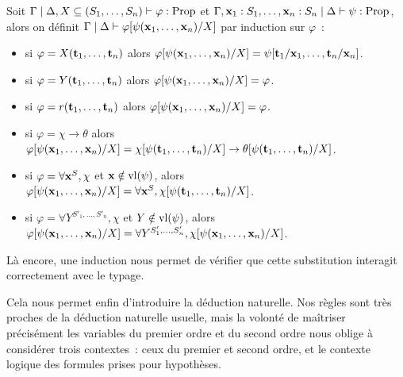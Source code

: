 \documentclass{article}
\begin{document}
\begin{defi}
    Soit $\Gamma\mid \Delta, X \subseteq (S_1,\ldots,S_n)\vdash \varphi : \mathrm{Prop}$ et $\Gamma, \mathbf{x}_1 : S_1,\ldots, \mathbf{x}_n : S_n\mid\Delta\vdash \psi : \mathrm{Prop}$, alors on définit $\Gamma\mid\Delta\vdash\varphi[\psi(\mathbf{x}_1,\ldots,\mathbf{x}_n)/X]$ par induction sur $\varphi$~:
    \begin{itemize}
        \item si $\varphi = X(\mathbf{t}_1,\ldots,\mathbf{t}_n)$ alors $\varphi[\psi(\mathbf{x}_1,\ldots,\mathbf{x}_n)/X] = \psi[\mathbf{t}_1/\mathbf{x}_1,\ldots,\mathbf{t}_n/\mathbf{x}_n]$.
        \item si $\varphi = Y(\mathbf{t}_1,\ldots,\mathbf{t}_n)$ alors $\varphi[\psi(\mathbf{x}_1,\ldots,\mathbf{x}_n)/X] = \varphi$.
        \item si $\varphi = r(\mathbf{t}_1,\ldots,\mathbf{t}_n)$ alors $\varphi[\psi(\mathbf{x}_1,\ldots,\mathbf{x}_n)/X] = \varphi$.
        \item si $\varphi = \chi \to \theta$ alors $\varphi[\psi(\mathbf{x}_1,\ldots,\mathbf{x}_n)/X] = \chi[\psi(\mathbf{t}_1,\ldots,\mathbf{t}_n)/X] \to \theta[\psi(\mathbf{t}_1,\ldots,\mathbf{t}_n)/X]$.
        \item si $\varphi = \forall \mathbf{x}^S, \chi$ et $\mathbf{x} \notin \mathrm{vl}(\psi)$, alors $\varphi[\psi(\mathbf{x}_1,\ldots,\mathbf{x}_n)/X] = \forall \mathbf{x}^S, \chi[\psi(\mathbf{t}_1,\ldots,\mathbf{t}_n)/X]$.
        \item si $\varphi = \forall Y^{S'_1,\ldots,S'_n}, \chi$ et $Y\notin\mathrm{vl}(\psi)$, alors $\varphi[\psi(\mathbf{x}_1,\ldots,\mathbf{x}_n)/X] = \forall Y^{S'_1,\ldots,S'_n}, \chi[\psi(\mathbf{x}_1,\ldots,\mathbf{x}_n)/X]$.
    \end{itemize}
\end{defi}

Là encore, une induction nous permet de vérifier que cette substitution interagit correctement avec le typage.

Cela nous permet enfin d'introduire la déduction naturelle. Nos règles sont très proches de la déduction naturelle usuelle, mais la volonté de maîtriser précisément les variables du premier ordre et du second ordre nous oblige à considérer trois contextes~: ceux du premier et second ordre, et le contexte logique des formules prises pour hypothèses.
\end{document}
